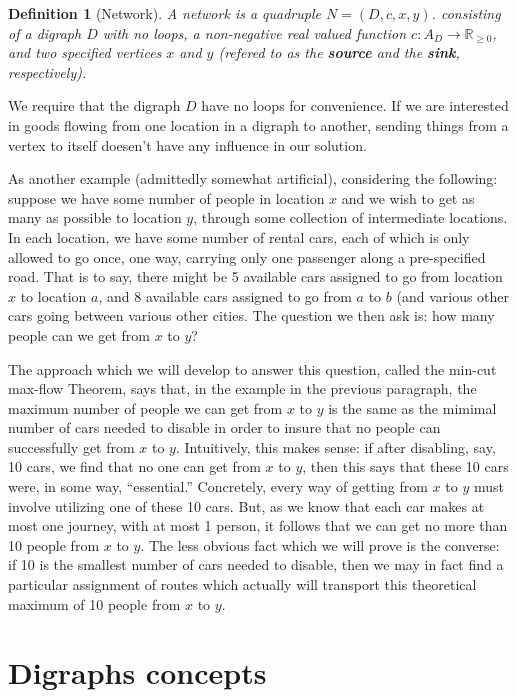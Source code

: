 \documentclass[12pt]{report}
\theoremstyle{plain}
\newtheorem{defn}[thm]{Definition}
\begin{document}
\begin{defn}[Network]
A network is a quadruple $N = (D, c, x, y)$. consisting of a digraph $D$
with no loops,
a non-negative real valued function $c: A_D \to \mathbb R_{\geq 0}$, and
two specified vertices $x$ and $y$ (refered to as the
\textbf{source} and the
\textbf{sink}, respectively).
\end{defn}

We require that the digraph $D$ have no loops for convenience. If we are
interested in goods flowing from one location in a digraph to another,
sending things from a vertex to itself doesen't have any influence in our
solution.

As another example (admittedly somewhat artificial), considering the
following: suppose we have some number of people in location $x$ and we
wish to get as many as possible to location $y$, through some collection of
intermediate locations. In each location, we have some number of rental
cars, each of which is only allowed to go once, one way, carrying only one
passenger along a pre-specified road. That is to say, there might be 5
available cars assigned to go from location $x$ to location $a$, and 8
available cars assigned to go from $a$ to $b$ (and various other cars going
between various other cities. The question we then ask is: how many people
can we get from $x$ to $y$?

The approach which we will develop to answer this question, called the
min-cut max-flow Theorem, says that, in the example in the previous
paragraph, the maximum number of people we can get from $x$ to $y$ is the
same as the mimimal number of cars needed to disable in order to insure
that no people can successfully get from $x$ to $y$. Intuitively, this
makes sense: if after disabling, say, 10 cars, we find that no one can get
from $x$ to $y$, then this says that these 10 cars were, in some way,
``essential.'' Concretely, every way of getting from $x$ to $y$ must
involve utilizing one of these 10 cars. But, as we know that each car makes
at most one journey, with at most 1 person, it follows that we can get no
more than 10 people from $x$ to $y$. The less obvious fact which we will
prove is the converse: if 10 is the smallest number of cars needed to
disable, then we may in fact find a particular assignment of routes which
actually will transport this theoretical maximum of 10 people from $x$ to
$y$.

\section{Digraphs concepts}
\end{document}
